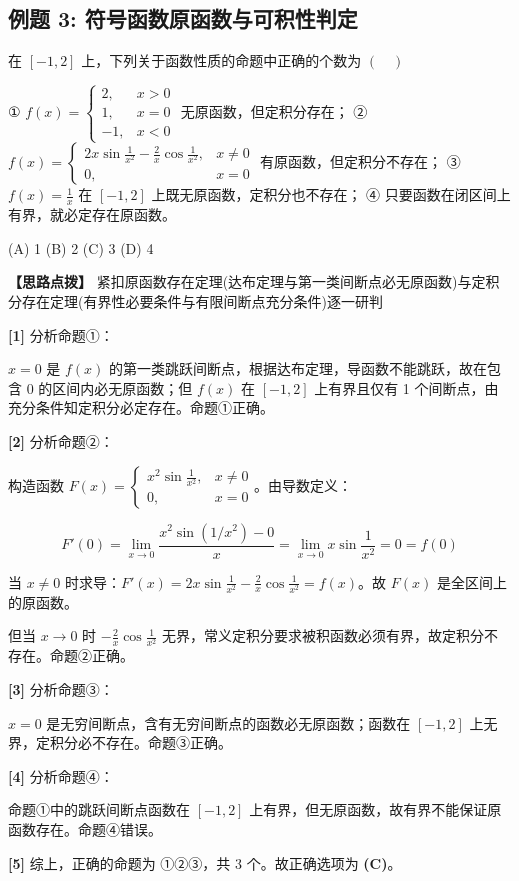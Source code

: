 \documentclass[11pt,a4paper,UTF8]{ctexart}
\begin{document}
\subsection{例题 3: 符号函数原函数与可积性判定}

在 $[-1, 2]$ 上，下列关于函数性质的命题中正确的个数为 $(\quad)$

① $f(x) = \begin{cases} 2, & x > 0 \\ 1, & x = 0 \\ -1, & x < 0 \end{cases}$ 无原函数，但定积分存在；
② $f(x) = \begin{cases} 2x\sin\frac{1}{x^2} - \frac{2}{x}\cos\frac{1}{x^2}, & x \neq 0 \\ 0, & x = 0 \end{cases}$ 有原函数，但定积分不存在；
③ $f(x) = \frac{1}{x}$ 在 $[-1, 2]$ 上既无原函数，定积分也不存在；
④ 只要函数在闭区间上有界，就必定存在原函数。

(A) 1 \qquad (B) 2 \qquad (C) 3 \qquad (D) 4

\textbf{\color{DeepPurple}【思路点拨】} 紧扣原函数存在定理(达布定理与第一类间断点必无原函数)与定积分存在定理(有界性必要条件与有限间断点充分条件)逐一研判


\begin{solbox}[分步推导与答题规范]
\textbf{[1]} 分析命题①：

$x = 0$ 是 $f(x)$ 的第一类跳跃间断点，根据达布定理，导函数不能跳跃，故在包含 $0$ 的区间内必无原函数；但 $f(x)$ 在 $[-1, 2]$ 上有界且仅有 1 个间断点，由充分条件知定积分必定存在。命题①正确。

\textbf{[2]} 分析命题②：

构造函数 $F(x) = \begin{cases} x^2\sin\frac{1}{x^2}, & x \neq 0 \\ 0, & x = 0 \end{cases}$。由导数定义：


\begin{equation*}
F'(0) = \lim_{x \to 0} \frac{x^2\sin(1/x^2) - 0}{x} = \lim_{x \to 0} x\sin\frac{1}{x^2} = 0 = f(0)
\end{equation*}


当 $x \neq 0$ 时求导：$F'(x) = 2x\sin\frac{1}{x^2} - \frac{2}{x}\cos\frac{1}{x^2} = f(x)$。故 $F(x)$ 是全区间上的原函数。

但当 $x \to 0$ 时 $-\frac{2}{x}\cos\frac{1}{x^2}$ 无界，常义定积分要求被积函数必须有界，故定积分不存在。命题②正确。

\textbf{[3]} 分析命题③：

$x = 0$ 是无穷间断点，含有无穷间断点的函数必无原函数；函数在 $[-1, 2]$ 上无界，定积分必不存在。命题③正确。

\textbf{[4]} 分析命题④：

命题①中的跳跃间断点函数在 $[-1, 2]$ 上有界，但无原函数，故有界不能保证原函数存在。命题④错误。

\textbf{[5]} 综上，正确的命题为 ①②③，共 3 个。故正确选项为 \textbf{(C)}。
\end{solbox}
\end{document}
